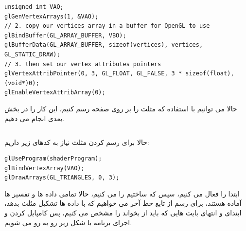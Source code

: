 \documentclass[a4paper, 12pt]{book}
\newcommand{\lrit}[1]{\lr{\textit{#1}}}
\begin{document}
    \begin{LTR}
    \small
        \begin{lstlisting}[style=C++Style,caption=\lrit{link vertex attribute to vertex data}]
unsigned int VAO;
glGenVertexArrays(1, &VAO);
// 2. copy our vertices array in a buffer for OpenGL to use
glBindBuffer(GL_ARRAY_BUFFER, VBO);
glBufferData(GL_ARRAY_BUFFER, sizeof(vertices), vertices, GL_STATIC_DRAW);
// 3. then set our vertex attributes pointers
glVertexAttribPointer(0, 3, GL_FLOAT, GL_FALSE, 3 * sizeof(float), (void*)0);
glEnableVertexAttribArray(0);

        \end{lstlisting}
    \end{LTR}
    \normalsize
    \vspace*{0.3cm}


    حالا می توانیم با استفاده  که  مثلث را بر روی صفحه رسم کنیم، این کار را در بخش بعدی انجام می دهیم.

\newpage
\subsection*{}
\noindent
\normalsize
    حالا برای رسم کردن مثلث نیاز به کدهای زیر داریم:

    \begin{LTR}
    \small
        \begin{lstlisting}[style=C++Style,caption=\lrit{link vertex attribute to vertex data}]
glUseProgram(shaderProgram);
glBindVertexArray(VAO);
glDrawArrays(GL_TRIANGLES, 0, 3);
        \end{lstlisting}
    \end{LTR}
    \normalsize
    \vspace*{0.3cm}

    ابتدا  را فعال می کنیم، سپس  که ساختیم را  می کنیم، حالا تمامی داده ها و تفسیر ها آماده هستند، برای رسم از تابع خط آخر می خواهیم که با داده ها تشکیل مثلث بدهد، ابتدای و انتهای بایت هایی که باید از  بخواند را مشخص می کنیم، پس کامپایل کردن و اجرای برنامه با شکل زیر رو به رو می شویم.
\end{document}
